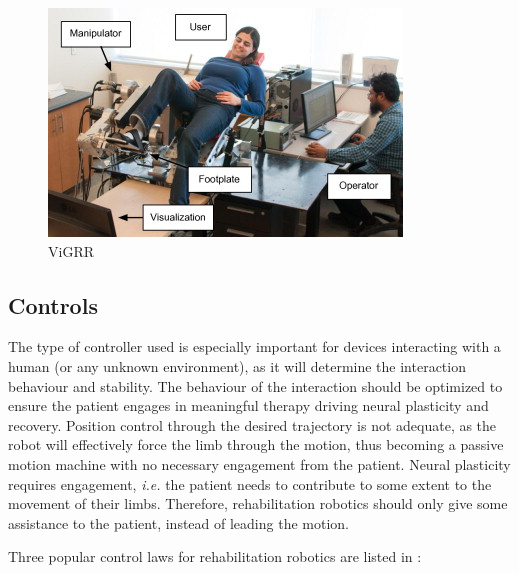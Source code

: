 \documentclass[12pt]{report}
\begin{document}
	
	\begin{figure}[t] 
		\centering
		\includegraphics[width=0.75\linewidth]{Vigrr}
		\caption{ViGRR}
		\label{fig:vigrr}
	\end{figure}	
	
	

	
	
	\subsection{Controls} 
	
	The type of controller used is especially important for devices interacting with a human (or any unknown environment), as it will determine the interaction behaviour and stability. The behaviour of the interaction should be optimized to ensure the patient engages in meaningful therapy driving neural plasticity and recovery. Position control through the desired trajectory is not adequate, as the robot will effectively force the limb through the motion, thus becoming a passive motion machine with no necessary engagement from the patient. Neural plasticity requires engagement, \textit{i.e.} the patient needs to contribute to some extent to the movement of their limbs. Therefore, rehabilitation robotics should only give some assistance to the patient, instead of leading the motion. 
	
	Three popular control laws for rehabilitation robotics are listed in \cite{Meng2015}:
	
\end{document}
